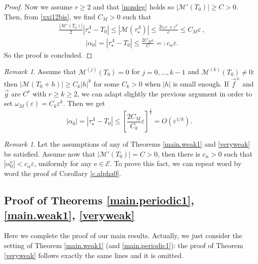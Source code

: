 \documentclass[10pt]{article}
\numberwithin{equation}{section}
\def\al{\alpha}
\def\ep{\varepsilon}
\def\ee{{\mathrm e}}
\def\EE{{\mathcal E}}
\def\MM{{\mathcal M}}
\def\f{\vec{f}}
\def\g{\vec{g}}
\theoremstyle{definition}
\theoremstyle{remark}
\newtheorem{remark}[theorem]{Remark}
\begin{document}
\begin{proof}
Now we assume   $r \ge 2$ and that \eqref{nondeg} holds so $|\MM'(T_0)| \ge C>0$. Then, from \eqref{xxi12bis}, we  find $C_M>0$ such
that
  \begin{equation*}
  \begin{split}
      &  \frac{|\MM'(T_0)|}{2} |\tau_\star^{\Lambda}-T_0| \le |\MM(\tau_\star^{\Lambda})| \le  \frac{2 c_r \ep + \ep^{\bar{\nu}}}{c}  \le C_M
      \ep
      \, ,
  \end{split}
  \end{equation*}
  \begin{equation}\label{tau12*}
  \begin{split}
      &   |\alpha_0| =|\tau_\star^{\Lambda}-T_0|  \le  \frac{2 C_M \ep}{C}=:c_{\alpha} \ep.
  \end{split}
  \end{equation}
So the proof is concluded.
 \end{proof}

\begin{remark}
  Assume that $\MM^{(j)}(T_0)=0$ for $j=0, \ldots, k-1$ and $\MM^{(k)}(T_0)\ne 0$: then $|\MM(T_0+h)| \geq  C_k |h|^k$ for some
  $C_k>0$ when $|h|$ is small enough. If $\f^{\pm}$ and $\g$ are $C^r$ with $r \ge k \ge 2$, we can adapt slightly the
  previous argument
  in order to set $\omega_M(\ep)= C_k \ep^k$. Then we
  get
 $$|\alpha_0| = |\tau_\star^{\Lambda}-T_0| \le \left[\frac{2 C_M}{C_k} \ep \right]^{\frac{1}{k}} = O(\ep^{1/k}) .$$
\end{remark}
\begin{remark}\label{foralpha0}
  Let the assumptions of any of Theorems \ref{main.weak1}  and \ref{veryweak} be satisfied.
Assume now that $|\MM'(T_0)|=C > 0$, then  there is $c_{\alpha}>0$ such that
$|\al^{\ee}_0|< c_{\alpha} \ep$, uniformly  for any $\ee \in \EE$.
To prove this fact, we can repeat word by word the proof of Corollary \ref{c.alpha0}.
\end{remark}


\subsection{Proof of Theorems \ref{main.periodic1}, \ref{main.weak1}, \ref{veryweak}}


 Here we complete the proof of our main results.
Actually, we  just consider the setting of Theorem \ref{main.weak1} (and \ref{main.periodic1}): the proof of Theorem \ref{veryweak} follows exactly the same lines and it is omitted.
\end{document}
